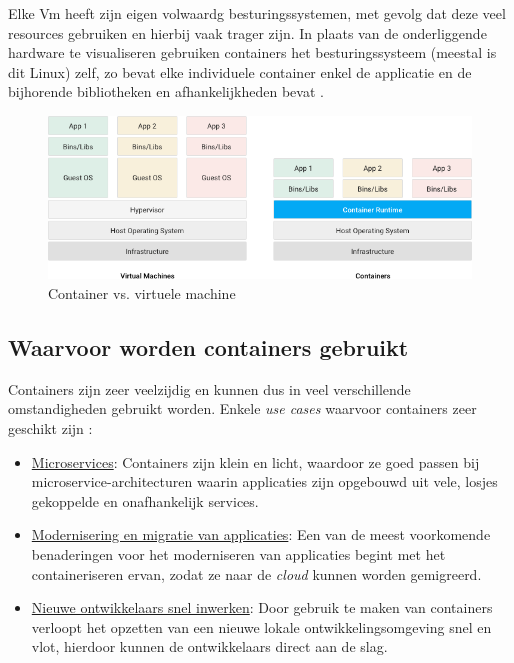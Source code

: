Elke Vm heeft zijn eigen volwaardg besturingssystemen, met gevolg dat deze veel resources gebruiken en hierbij vaak trager zijn. In plaats van de onderliggende hardware te visualiseren gebruiken containers het besturingssysteem (meestal is dit Linux) zelf, zo bevat elke individuele container enkel de applicatie en de bijhorende bibliotheken en afhankelijkheden bevat \autocite{Education2020}.

\begin{figure}[ht]
    \centering
    \includegraphics[width=\linewidth]{img/container-vs-vm.png}
    \caption{Container vs. virtuele machine \autocite{Google2016}}
    \label{fig:example}
\end{figure}


\subsection{Waarvoor worden containers gebruikt}
Containers zijn zeer veelzijdig en kunnen dus in veel verschillende omstandigheden gebruikt worden. Enkele \textit{use cases} waarvoor containers zeer geschikt zijn \autocite{Docker2021}:

\begin{itemize}
  \item \underline{Microservices}: Containers zijn klein en licht, waardoor ze goed passen bij microservice-architecturen waarin applicaties zijn opgebouwd uit vele, losjes gekoppelde en onafhankelijk services.
  \item \underline{Modernisering en migratie van applicaties}: Een van de meest voorkomende benaderingen voor het moderniseren van applicaties begint met het containeriseren ervan, zodat ze naar de \textit{cloud} kunnen worden gemigreerd.
  \item \underline{Nieuwe ontwikkelaars snel inwerken}: Door gebruik te maken van containers verloopt het opzetten van een nieuwe lokale ontwikkelingsomgeving snel en vlot, hierdoor kunnen de ontwikkelaars direct aan de slag.
\end{itemize}


